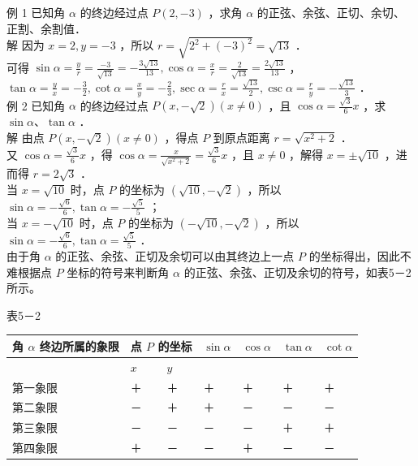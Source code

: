 \documentclass[10pt]{article}
\begin{document}
例 1 已知角 \(\alpha\) 的终边经过点 \(P(2,-3)\) ，求角 \(\alpha\) 的正弦、余弦、正切、余切、正割、余割值．\\
解 因为 \(x=2, y=-3\) ，所以 \(r=\sqrt{2^{2}+(-3)^{2}}=\sqrt{13}\) ．\\
可得 \(\sin \alpha=\frac{y}{r}=\frac{-3}{\sqrt{13}}=-\frac{3 \sqrt{13}}{13}, \cos \alpha=\frac{x}{r}=\frac{2}{\sqrt{13}}=\frac{2 \sqrt{13}}{13}\) ，\\
\(\tan \alpha=\frac{y}{x}=-\frac{3}{2}, \cot \alpha=\frac{x}{y}=-\frac{2}{3}, \sec \alpha=\frac{r}{x}=\frac{\sqrt{13}}{2}, \csc \alpha=\frac{r}{y}=-\frac{\sqrt{13}}{3}\) ．\\
例 2 已知角 \(\alpha\) 的终边经过点 \(P(x,-\sqrt{2})(x \neq 0)\) ，且 \(\cos \alpha=\frac{\sqrt{3}}{6} x\) ，求 \(\sin \alpha 、 \tan \alpha\) ．\\
解 由点 \(P(x,-\sqrt{2})(x \neq 0)\) ，得点 \(P\) 到原点距离 \(r=\sqrt{x^{2}+2}\) ．\\
又 \(\cos \alpha=\frac{\sqrt{3}}{6} x\) ，得 \(\cos \alpha=\frac{x}{\sqrt{x^{2}+2}}=\frac{\sqrt{3}}{6} x\) ，且 \(x \neq 0\) ，解得 \(x= \pm \sqrt{10}\) ，进而得 \(r=2 \sqrt{3}\) ．\\
当 \(x=\sqrt{10}\) 时，点 \(P\) 的坐标为 \((\sqrt{10},-\sqrt{2})\) ，所以 \(\sin \alpha=-\frac{\sqrt{6}}{6}, \tan \alpha=-\frac{\sqrt{5}}{5}\) ；\\
当 \(x=-\sqrt{10}\) 时，点 \(P\) 的坐标为 \((-\sqrt{10},-\sqrt{2})\) ，所以 \(\sin \alpha=-\frac{\sqrt{6}}{6}, \tan \alpha=\frac{\sqrt{5}}{5}\) ．\\
由于角 \(\alpha\) 的正弦、余弦、正切及余切可以由其终边上一点 \(P\) 的坐标得出，因此不难根据点 \(P\) 坐标的符号来判断角 \(\alpha\) 的正弦、余弦、正切及余切的符号，如表5－2所示。

表5－2

\begin{center}
\begin{tabular}{|l|l|l|l|l|l|l|}
\hline
\multirow{2}{*}{角 \(\alpha\) 终边所属的象限} & \multicolumn{2}{|c|}{点 \(P\) 的坐标} & \multirow{2}{*}{\(\sin \alpha\)} & \multirow{2}{*}{\(\cos \alpha\)} & \multirow{2}{*}{\(\tan \alpha\)} & \multirow{2}{*}{\(\cot \alpha\)} \\
\hline
 & \(x\) & \(y\) &  &  &  &  \\
\hline
第一象限 & ＋ & ＋ & ＋ & ＋ & ＋ & ＋ \\
\hline
第二象限 & － & ＋ & ＋ & － & － & － \\
\hline
第三象限 & － & － & － & － & ＋ & ＋ \\
\hline
第四象限 & ＋ & － & － & ＋ & － & － \\
\hline
\end{tabular}
\end{center}
\end{document}
